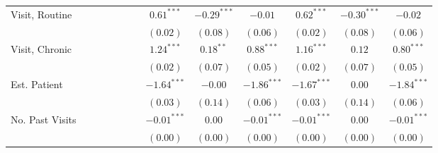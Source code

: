 \documentclass[12pt,twoside]{reedthesis}
\begin{document}
\begin{table}
\begin{center}
\begin{tiny}
\begin{tabular}{l@{} c@{} c@{} c@{} c@{} c@{} c@{} c@{} c@{} c@{} c@{} c@{} c@{} }
  Visit, Routine     &                       &                        &                        &                        &                        &                        & $\mathbf{0.61}^{***}$  & $\mathbf{-0.29}^{***}$ & $-0.01$                & $\mathbf{0.62}^{***}$  & $\mathbf{-0.30}^{***}$ & $-0.02$                \\
                     &                       &                        &                        &                        &                        &                        & $(0.02)$               & $(0.08)$               & $(0.06)$               & $(0.02)$               & $(0.08)$               & $(0.06)$               \\
  Visit, Chronic     &                       &                        &                        &                        &                        &                        & $\mathbf{1.24}^{***}$  & $\mathbf{0.18}^{**}$   & $\mathbf{0.88}^{***}$  & $\mathbf{1.16}^{***}$  & $0.12$                 & $\mathbf{0.80}^{***}$  \\
                     &                       &                        &                        &                        &                        &                        & $(0.02)$               & $(0.07)$               & $(0.05)$               & $(0.02)$               & $(0.07)$               & $(0.05)$               \\
  Est. Patient       &                       &                        &                        &                        &                        &                        & $\mathbf{-1.64}^{***}$ & $-0.00$                & $\mathbf{-1.86}^{***}$ & $\mathbf{-1.67}^{***}$ & $0.00$                 & $\mathbf{-1.84}^{***}$ \\
                     &                       &                        &                        &                        &                        &                        & $(0.03)$               & $(0.14)$               & $(0.06)$               & $(0.03)$               & $(0.14)$               & $(0.06)$               \\
  No. Past Visits    &                       &                        &                        &                        &                        &                        & $\mathbf{-0.01}^{***}$ & $0.00$                 & $\mathbf{-0.01}^{***}$ & $\mathbf{-0.01}^{***}$ & $0.00$                 & $\mathbf{-0.01}^{***}$ \\
                     &                       &                        &                        &                        &                        &                        & $(0.00)$               & $(0.00)$               & $(0.00)$               & $(0.00)$               & $(0.00)$               & $(0.00)$               \\

\end{tabular}
\end{tiny}
\end{center}
\end{table}
\end{document}
